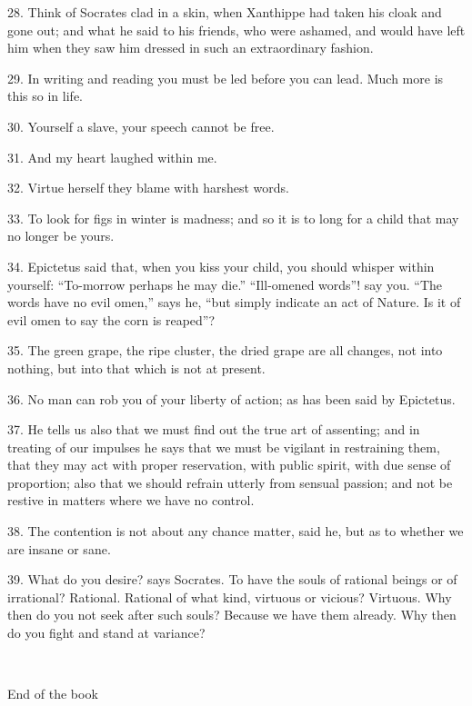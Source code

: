 \documentclass{book}
\newcommand\terminus[1]{\vspace{2em}\emph{#1} \\[2em] \begin{center}End of the \ordinalstring{chapter} book\end{center}}
\begin{document}
28. Think of Socrates clad in a skin, when Xanthippe had taken his
cloak and gone out; and what he said to his friends, who were ashamed,
and would have left him when they saw him dressed in such an
extraordinary fashion.

29. In writing and reading you must be led before you can lead. Much
more is this so in life.

30. Yourself a slave, your speech cannot be free.

31. And my heart laughed within me.

32. Virtue herself they blame with harshest words.

33. To look for figs in winter is madness; and so it is to long for a
child that may no longer be yours.

34. Epictetus said that, when you kiss your child, you should whisper
within yourself: ``To-morrow perhaps he may die.'' ``Ill-omened words''!
say you. ``The words have no evil omen,'' says he, ``but simply indicate
an act of Nature. Is it of evil omen to say the corn is reaped''?

35. The green grape, the ripe cluster, the dried grape are all
changes, not into nothing, but into that which is not at present.

36. No man can rob you of your liberty of action; as has been said by
Epictetus.

37. He tells us also that we must find out the true art of assenting;
and in treating of our impulses he says that we must be vigilant in
restraining them, that they may act with proper reservation, with
public spirit, with due sense of proportion; also that we should
refrain utterly from sensual passion; and not be restive in matters
where we have no control.

\newpage

38. The contention is not about any chance matter, said he, but as to
whether we are insane or sane.

39. What do you desire? says Socrates. To have the souls of rational
beings or of irrational? Rational. Rational of what kind, virtuous or
vicious? Virtuous. Why then do you not seek after such souls? Because
we have them already. Why then do you fight and stand at variance?

\terminus{}
\chapter[All that you desire...]{}
\end{document}
